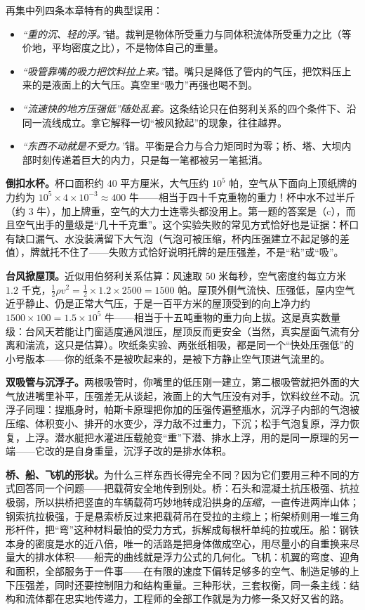 再集中列四条本章特有的典型误用：

\begin{itemize}[leftmargin=1.8em]
  \item \emph{“重的沉、轻的浮。”}错。裁判是物体所受重力与同体积流体所受重力之比（等价地，平均密度之比），不是物体自己的重量。
  \item \emph{“吸管靠嘴的吸力把饮料拉上来。”}错。嘴只是降低了管内的气压，把饮料压上来的是液面上的大气压。真空里“吸力”再强也喝不到。
  \item \emph{“流速快的地方压强低”随处乱套。}这条结论只在伯努利关系的四个条件下、沿同一流线成立。拿它解释一切“被风掀起”的现象，往往越界。
  \item \emph{“东西不动就是不受力。”}错。平衡是合力与合力矩同时为零；桥、塔、大坝内部时刻传递着巨大的内力，只是每一笔都被另一笔抵消。
\end{itemize}


\textbf{倒扣水杯。}杯口面积约 \(40\) 平方厘米，大气压约 \(10^{5}\) 帕，空气从下面向上顶纸牌的力约为 \(10^{5}\times4\times10^{-3}\approx 400\) 牛——相当于四十千克重物的重力！杯中水不过半斤（约 \(3\) 牛），加上牌重，空气的大力士连零头都没用上。第一题的答案是（c），而且空气出手的量级是“几十千克重”。这个实验失败的常见方式恰好也是证据：杯口有缺口漏气、水没装满留下大气泡（气泡可被压缩，杯内压强建立不起足够的差值），牌就托不住了——失败方式恰好说明托牌的是压强差，不是“粘”或“吸”。

\textbf{台风掀屋顶。}近似用伯努利关系估算：风速取 \(50\) 米每秒，空气密度约每立方米 \(1.2\) 千克，\(\tfrac{1}{2}\rho v^{2}=\tfrac{1}{2}\times1.2\times2500=1500\) 帕。屋顶外侧气流快、压强低，屋内空气近乎静止、仍是正常大气压，于是一百平方米的屋顶受到的向上净力约 \(1500\times100=1.5\times10^{5}\) 牛——相当于十五吨重物的重力向上拔。这是真实数量级：台风天若能让门窗适度通风泄压，屋顶反而更安全（当然，真实屋面气流有分离和湍流，这只是估算）。吹纸条实验、两张纸相吸，都是同一个“快处压强低”的小号版本——你的纸条不是被吹起来的，是被下方静止空气顶进气流里的。

\textbf{双吸管与沉浮子。}两根吸管时，你嘴里的低压刚一建立，第二根吸管就把外面的大气放进嘴里补平，压强差无从谈起，液面上的大气压没有对手，饮料纹丝不动。沉浮子同理：捏瓶身时，帕斯卡原理把你加的压强传遍整瓶水，沉浮子内部的气泡被压缩、体积变小、排开的水变少，浮力敌不过重力，下沉；松手气泡复原，浮力恢复，上浮。潜水艇把水灌进压载舱变“重”下潜、排水上浮，用的是同一原理的另一端——它改的是自身重量，沉浮子改的是排水体积。

\textbf{桥、船、飞机的形状。}为什么三样东西长得完全不同？因为它们要用三种不同的方式回答同一个问题——把载荷安全地传到别处。桥：石头和混凝土抗压极强、抗拉极弱，所以拱桥把竖直的车辆载荷巧妙地转成沿拱身的\emph{压缩}，一直传进两岸山体；钢索抗拉极强，于是悬索桥反过来把载荷吊在受拉的主缆上；桁架桥则用一堆三角形杆件，把“弯”这种材料最怕的受力方式，拆解成每根杆单纯的拉或压。船：钢铁本身的密度是水的近八倍，唯一的活路是把身体做成空心，用尽量小的自重换来尽量大的排水体积——船壳的曲线就是浮力公式的几何化。飞机：机翼的弯度、迎角和面积，全部服务于一件事——在有限的速度下偏转足够多的空气、制造足够的上下压强差，同时还要控制阻力和结构重量。三种形状，三套权衡，同一条主线：结构和流体都在忠实地传递力，工程师的全部工作就是为力修一条又好又省的路。

